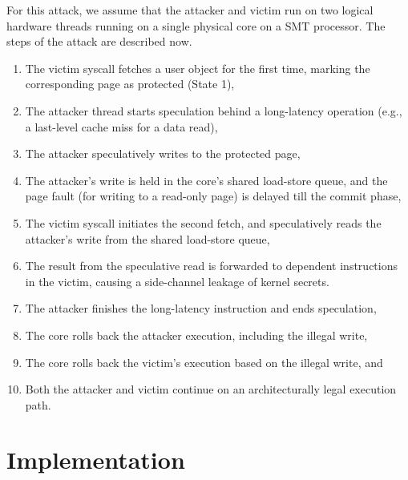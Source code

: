 For this attack, we assume that the attacker and victim run on two logical
hardware threads running on a single physical core on a SMT processor.
The steps of the attack are described now.
\begin{enumerate}
  \item The victim syscall fetches a user object for the first time,
        marking the corresponding page as protected (State 1), 
  \item The attacker thread starts speculation behind a long-latency operation
        (e.g., a last-level cache miss for a data read),
  \item The attacker speculatively writes to the protected page, 
  \item The attacker's write is held in the core's shared load-store queue,
        and the page fault (for writing to a read-only page) is delayed till
        the commit phase,
  \item The victim syscall initiates the second fetch, and speculatively reads
        the attacker's write from the shared load-store queue, 
  \item The result from the speculative read is forwarded to dependent 
        instructions in the victim, causing a side-channel leakage of
        kernel secrets.
  \item The attacker finishes the long-latency instruction and ends speculation,
  \item The core rolls back the attacker execution, including the illegal 
        write, 
  \item The core rolls back the victim's execution based on the illegal 
        write, and
  \item Both the attacker and victim continue on an architecturally legal
        execution path.
\end{enumerate}


\section{\midas Implementation}
\label{sec:midas:impl}

